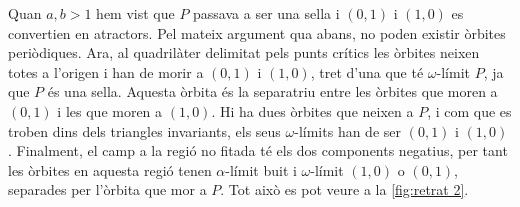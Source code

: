 \documentclass[12pt]{article}
\numberwithin{table}{section}
\numberwithin{equation}{section}
\numberwithin{figure}{section}
\begin{document}
Quan \( a, b > 1 \) hem vist que \( P \) passava a ser una sella i \( (0,1) \) i \( (1,0) \) es convertien en atractors. Pel mateix argument qua abans, no poden existir òrbites periòdiques. Ara, al quadrilàter delimitat pels punts crítics les òrbites neixen totes a l'origen i han de morir a \( (0,1) \) i \( (1,0) \), tret d'una que té \( \omega \)-límit \( P \), ja que \( P \) és una sella. Aquesta òrbita és la separatriu entre les òrbites que moren a \( (0,1) \) i les que moren a \( (1,0) \). Hi ha dues òrbites que neixen a \( P \), i com que es troben dins dels triangles invariants, els seus \( \omega \)-límits han de ser \( (0,1) \) i \( (1,0) \). Finalment, el camp a la regió no fitada té els dos components negatius, per tant les òrbites en aquesta regió tenen \( \alpha \)-límit buit i \( \omega \)-límit \( (1,0) \) o \( (0,1) \), separades per l'òrbita que mor a \( P \). Tot això es pot veure a la \cref{fig:retrat 2}.
\end{document}

